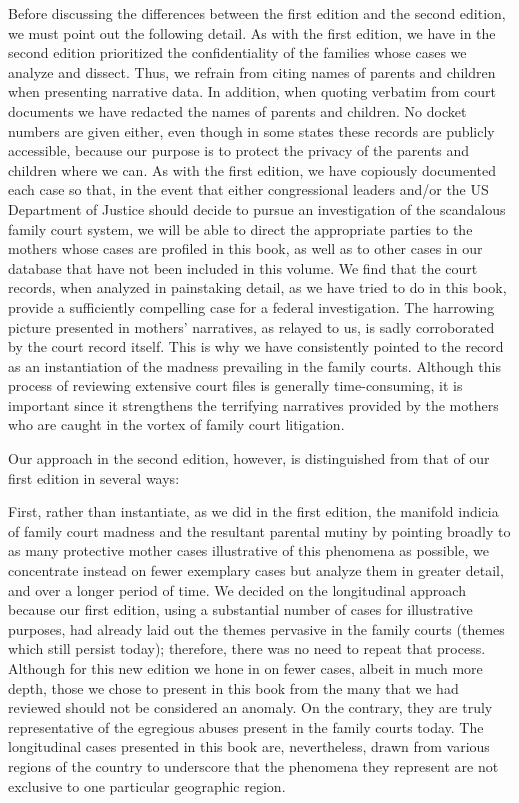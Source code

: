 \noindent{}Before discussing the differences between the first edition 
and the second edition, we must point out the following detail.
As with the first edition, we have in the second edition prioritized the confidentiality of the families whose cases we analyze and
dissect. Thus, we refrain from citing names of parents and children
when presenting narrative data. In addition, when quoting verbatim
from court documents we have redacted the names of parents and children. No docket numbers are given either, even though in some states
these records are publicly accessible, because our purpose is to protect
the privacy of the parents and children where we can. As with the first edition, we have
copiously documented each case so that, in the 
event that either congressional leaders and/or the US Department of Justice should decide to
pursue an investigation of the scandalous family court system, we will
be able to direct the appropriate parties to the mothers whose cases are profiled in this
book, as well as to other cases in our database that have not been included in this volume. We find that the court records, when analyzed in
painstaking detail, as we have tried to do in this book, provide a
sufficiently compelling case for a federal investigation. The harrowing
picture presented in mothers' narratives, as relayed to us, is sadly corroborated by the court record itself. This is why we have consistently
pointed to the record as an instantiation of the madness prevailing in
the family courts. Although this process of reviewing extensive court 
files is generally time-consuming, it is important since it strengthens
the terrifying narratives provided by the mothers who are caught in the
vortex of family court litigation. \pfl{}

Our approach in the second edition, however, is distinguished from
that of our first edition in several ways: \pfl{}

First, rather than instantiate, as we did in the first edition, the 
manifold indicia of family court madness and the resultant parental mutiny
by pointing broadly to as many protective mother cases illustrative of
this phenomena as possible, we concentrate instead on fewer exemplary
cases but analyze them in greater detail, and over a longer period of time.
We decided on the longitudinal approach because our first edition, using
a substantial number of cases for illustrative purposes, had already laid
out the themes pervasive in the family courts (themes which still persist
today); therefore, there was no need to repeat that process. Although for
this new edition we hone in on fewer cases, albeit in much more depth,
those we chose to present in this book from the many that we had 
reviewed should not be considered an anomaly. On the contrary, they are
truly representative of the egregious abuses present in the family courts
today. The longitudinal cases presented in this book are, nevertheless,
drawn from various regions of the country to underscore that the 
phenomena they represent are not exclusive to one particular geographic
region. \pfl{}

